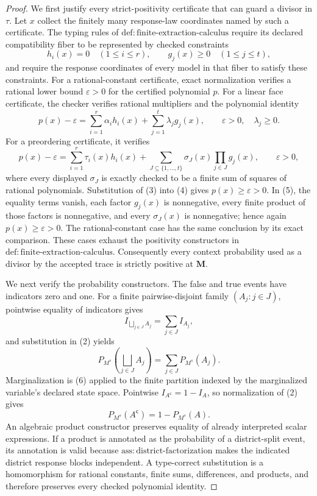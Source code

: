 \documentclass{article}
\begin{document}
\begin{proof}
We first justify every strict-positivity certificate that can guard a divisor in \(\tau\). Let \(x\) collect the finitely many response-law coordinates named by such a certificate. The typing rules of \(\mathrm{def:finite\text{-}extraction\text{-}calculus}\) require its declared compatibility fiber to be represented by checked constraints
\[
 h_i(x)=0\quad(1\le i\le r),
 \qquad
 g_j(x)\ge 0\quad(1\le j\le t),
\tag{3}
\]
and require the response coordinates of every model in that fiber to satisfy these constraints. For a rational-constant certificate, exact normalization verifies a rational lower bound \(\varepsilon>0\) for the certified polynomial \(p\). For a linear face certificate, the checker verifies rational multipliers and the polynomial identity
\[
 p(x)-\varepsilon
 =\sum_{i=1}^{r}\alpha_i h_i(x)
  +\sum_{j=1}^{t}\lambda_j g_j(x),
 \qquad \varepsilon>0,\quad \lambda_j\ge 0.
\tag{4}
\]
For a preordering certificate, it verifies
\[
 p(x)-\varepsilon
 =\sum_{i=1}^{r}\tau_i(x)h_i(x)
  +\sum_{J\subseteq\{1,\ldots,t\}}
    \sigma_J(x)\prod_{j\in J}g_j(x),
 \qquad \varepsilon>0,
\tag{5}
\]
where every displayed \(\sigma_J\) is exactly checked to be a finite sum of squares of rational polynomials. Substitution of (3) into (4) gives \(p(x)\ge\varepsilon>0\). In (5), the equality terms vanish, each factor \(g_j(x)\) is nonnegative, every finite product of those factors is nonnegative, and every \(\sigma_J(x)\) is nonnegative; hence again \(p(x)\ge\varepsilon>0\). The rational-constant case has the same conclusion by its exact comparison. These cases exhaust the positivity constructors in \(\mathrm{def:finite\text{-}extraction\text{-}calculus}\). Consequently every context probability used as a divisor by the accepted trace is strictly positive at \(\mathbf M\).

We next verify the probability constructors. The false and true events have indicators zero and one. For a finite pairwise-disjoint family \((A_j:j\in J)\), pointwise equality of indicators gives
\[
 I_{\bigsqcup_{j\in J}A_j}=\sum_{j\in J}I_{A_j},
\]
and substitution in (2) yields
\[
 P_{M^s}\!\left(\bigsqcup_{j\in J}A_j\right)
 =\sum_{j\in J}P_{M^s}(A_j).
\tag{6}
\]
Marginalization is (6) applied to the finite partition indexed by the marginalized variable's declared state space. Pointwise \(I_{A^{\mathsf c}}=1-I_A\), so normalization of (2) gives
\[
 P_{M^s}(A^{\mathsf c})=1-P_{M^s}(A).
\tag{7}
\]
An algebraic product constructor preserves equality of already interpreted scalar expressions. If a product is annotated as the probability of a district-split event, its annotation is valid because \(\mathrm{ass:district\text{-}factorization}\) makes the indicated district response blocks independent. A type-correct substitution is a homomorphism for rational constants, finite sums, differences, and products, and therefore preserves every checked polynomial identity.


\end{proof}
\end{document}
